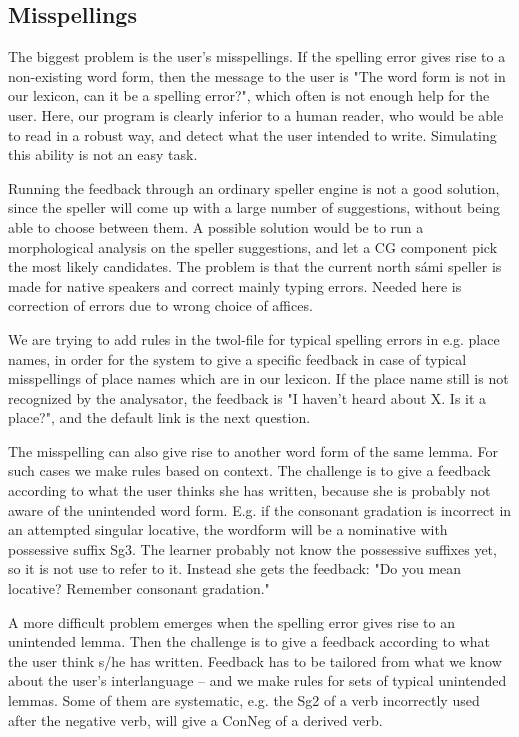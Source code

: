 \documentclass[11pt]{article}
\begin{document}
\subsection{Misspellings}
The biggest problem is the user's misspellings. If the spelling error gives rise to a non-existing word form, then the message to the user is "The word form is not in our lexicon, can it be a spelling error?", which often is not enough help for the user. Here, our program is clearly inferior to a human reader, who would be able to read in a robust way, and detect what the user intended to write. Simulating this ability is not an easy task.
 
Running the feedback through an ordinary speller engine is not a good solution, since the speller will come up with a large number of suggestions, without being able to choose between them. A possible solution would be to run a morphological analysis on the speller suggestions, and let a CG component pick the most likely candidates. The problem is that the current north sámi speller is made for native speakers and correct mainly typing errors. Needed here is correction of errors due to wrong choice of affices.

We are trying to add rules in the twol-file for typical spelling errors in e.g. place names, in order for the system to give a specific feedback in case of typical misspellings of place names which are in our lexicon. If the place name still is not recognized by the analysator, the feedback is "I haven’t heard about X. Is it a 
place?", and the default link is the next question.

The misspelling can also give rise to another word form of the same lemma. For such cases we make rules based on context. The challenge is to give a feedback according to what the user thinks she has written, because she is probably not aware of the unintended word form. E.g. if the consonant gradation is incorrect in an attempted singular locative, the wordform will be a nominative with possessive suffix Sg3. The learner probably not know the possessive suffixes yet, so it is not use to refer to it. Instead she gets the feedback: "Do you mean locative? Remember consonant gradation." 

A more difficult problem emerges when the spelling error gives rise to an unintended lemma. Then the challenge is to give a feedback according to what the user think s/he has written. Feedback has to be tailored from what we know about the user’s interlanguage – and we make rules for sets of typical unintended lemmas. Some of them are systematic, e.g. the Sg2 of a verb incorrectly used after the negative verb, will give a ConNeg of a derived verb.  
\end{document}
